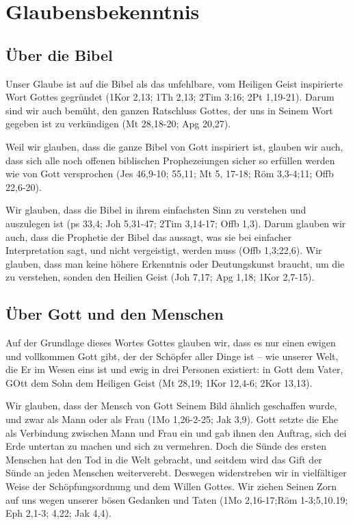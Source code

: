 \documentclass[12pt]{../../inc/mybib}
\author{Lothar Schmid}
\begin{document}
\section{Glaubensbekenntnis}
\subsection{Über die Bibel}
Unser Glaube ist auf die Bibel als das unfehlbare, vom Heiligen Geist inspirierte Wort Gottes gegründet (1Kor 2,13; 1Th 2,13; 2Tim 3:16; 2Pt 1,19-21). Darum sind wir auch bemüht, den \glqq ganzen Ratschluss Gottes\grqq, der uns in Seinem Wort gegeben ist zu verkündigen (Mt 28,18-20; Apg 20,27).

Weil wir glauben, dass die ganze Bibel von Gott inspiriert ist, glauben wir auch, dass sich alle noch offenen biblischen Prophezeiungen sicher so erfüllen werden wie von Gott versprochen (Jes 46,9-10; 55,11; Mt 5, 17-18; Röm 3,3-4;11; Offb 22,6-20).

Wir glauben, dass die Bibel in ihrem einfachsten Sinn zu verstehen und auszulegen ist (ps 33,4; Joh 5,31-47; 2Tim 3,14-17; Offb 1,3). Darum glauben wir auch, dass die Prophetie der Bibel das aussagt, was sie bei einfacher Interpretation sagt, und nicht vergeistigt, werden muss (Offb 1,3;22,6). Wir glauben, dass man keine höhere Erkenntnis oder Deutungskunst braucht, um die zu verstehen, sonden den Heilien Geist (Joh 7,17; Apg 1,18; 1Kor 2,7-15).

\subsection{Über Gott und den Menschen}
Auf der Grundlage dieses Wortes Gottes glauben wir, dass es nur einen ewigen und vollkommen Gott gibt, der der Schöpfer aller Dinge ist -- wie unserer Welt, die Er im Wesen eins ist und ewig in drei Personen existiert: in Gott dem Vater, GOtt dem Sohn dem Heiligen Geist (Mt 28,19; 1Kor 12,4-6; 2Kor 13,13).

Wir glauben, dass der Mensch von Gott Seinem Bild ähnlich geschaffen wurde, und zwar als Mann oder als Frau (1Mo 1,26-2-25; Jak 3,9). Gott setzte die Ehe als Verbindung zwischen Mann und Frau ein und gab ihnen den Auftrag, sich dei Erde untertan zu machen und sich zu vermehren. Doch die Sünde des ersten Menschen hat den Tod in die Welt gebracht, und seitdem wird das Gift der Sünde an jeden Menschen weiterverebt. Deswegen widerstreben wir in vielfältiger Weise der Schöpfungsordnung und dem Willen Gottes. Wir ziehen Seinen Zorn auf uns wegen unserer bösen Gedanken und Taten (1Mo 2,16-17;Röm 1-3;5,10.19; Eph 2,1-3; 4,22; Jak 4,4).
\end{document}
